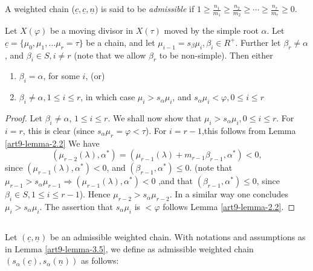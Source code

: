 \begin{definition}\label{art9-definition-3.4}
A weighted chain ($\underline{c}, \underline{c}, \underline{n} $) is said to be \textit{admissible} if $1 \geq \frac{n_{1}}{m_{1}}\geq \frac{n_{2}}{m_{2}}\geq \cdots \geq \frac{n_{r}}{m_{r}}\geq 0$.
\end{definition}

\begin{lemma}\label{art9-lemma-3.5}
Let $X(\varphi)$ be a moving divisor in $X(\tau)$ moved by the simple root $\alpha$. Let $\underline{c} = \{\mu_{0}, \mu_{1}, \ldots \mu_{r} = \tau\}$ be a chain, and let $\mu_{i-1} = s_{\beta}\mu_{i}, \beta_{i} \in R^{+}$. Further let
$\beta_{r} \neq \alpha$, and $\beta_{i} \in S, i\neq r$ (note that we allow $\beta_{r}$ to be non-simple). Then either
\begin{enumerate}[(1)]
\item $\beta_{i}=\alpha$, for some $i$, {\rm(or)}\label{art9-lemma3.5-enum-1}
\item $\beta_{i} \neq \alpha, 1 \leq i \leq r$, in which case $\mu_{i} > s_{\alpha}\mu_{i}$, and $s_{\alpha}\mu_{i} < \varphi, 0 \leq i \leq r$\label{art9-lemma3.5-enum-2}
\end{enumerate}
\end{lemma}

\begin{proof}
Let $\beta_{i} \neq \alpha$, $ 1 \leq i \leq r$. We shall now show that $ \mu_{i} > s_{\alpha}\mu_{i}, 0 \leq i \leq r$.
For $i=r$, this is clear (since $s_{\alpha}\mu_{r}= \varphi < \tau$). For $i=r-1$,this follows from Lemma
\ref{art9-lemma-2.2} We have
$$
(\mu_{r-2}(\lambda), \alpha^{*})= (\mu_{r-1}(\lambda)+ m_{r-1} \beta_{r-1}, \alpha^{*})< 0,
$$
since $(\mu_{r-1}(\lambda), \alpha^{*})< 0$, and $(\beta_{r-1}, \alpha^{*})\leq 0$. (note that $\mu_{r-1} > s_{\alpha}\mu_{r-1} \Rightarrow (\mu_{r-1}(\lambda), \alpha^{*})< 0$ ,and that $(\beta_{r-1}, \alpha^{*})\leq 0$, since $\beta_{i} \in S, 1\leq i \leq r-1$). Hence $\mu_{r-2} > s_{\alpha}\mu_{r-2}$. In a similar way one concludes $\mu_{i} > s_{\alpha}\mu_{i}$. The assertion that $s_{\alpha}\mu_{i}$ is $< \varphi$ follows Lemma \ref{art9-lemma-2.2}.
\end{proof}

\setcounter{subsection}{5}
\subsection{}\label{art9-subsec-3.6}

Let $(\underline{c}, \underline{n})$ be an admissible weighted chain. With notations and assumptions as in
Lemma \ref{art9-lemma-3.5}, we define as admissible weighted chain $(s_{\alpha}(\underline{c}), s_{\alpha}(\underline{n}))$ as follows:

